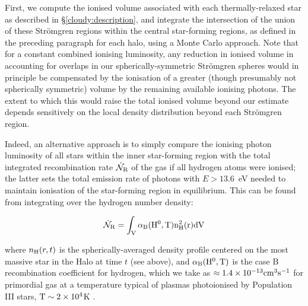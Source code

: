 \documentclass[twocolumn,iop,revtex4]{openjournal}
\begin{document}
First, we compute the ionised volume associated with each thermally-relaxed star as
described in \S\ref{cloudy:description}, and integrate the intersection of the union of these
Str{\"o}mgren regions within the central star-forming regions, as defined in the preceding paragraph
for each halo, using a Monte Carlo approach. Note that for a constant combined ionising luminosity,
any reduction in ionised volume in accounting for overlaps in our spherically-symmetric
Str{\"o}mgren spheres would in principle be compensated by the ionisation of a greater
(though presumably not spherically symmetric) volume by the remaining available
ionising photons. The extent to which this would raise the total ionised volume beyond
our estimate depends sensitively on the local density distribution beyond each Str{\" o}mgren region.

Indeed, an alternative approach is to simply compare the ionising photon luminosity of all stars
within the inner star-forming region with the total integrated recombination rate $\dot{\mathcal{N}}_{\rm R}$ of the gas if
all hydrogen atoms were ionised; the latter sets the total emission rate of photons with
$E>13.6$~eV needed to maintain ionisation of the star-forming region in equilibrium. This can be
found from integrating over the hydrogen number density:

\begin{equation}
  \dot{\mathcal{N}}_{\rm R} = \int_{\rm{V}}\alpha_{\rm{B}}(\rm{H}^{0},T)n_{\rm{H}}^{2}(r)d\rm{V}
\end{equation}

\noindent where $n_{\rm{H}}(r, t)$ is the spherically-averaged density profile centered on the
most massive star in the Halo at time $t$ (see above), and $\alpha_{\rm{B}}(\rm{H}^{0},T)$ is the
case B recombination coefficient for hydrogen, which we take
as $\approx1.4\times 10^{-13}\rm{cm}^{3}\rm{s}^{-1}$ for primordial gas at a temperature typical of
plasmas photoionised by Population III stars, $\rm{T}\sim 2\times 10^{4}$K
\citep{Osterbrock2006, Johnson2012}. 
\end{document}
